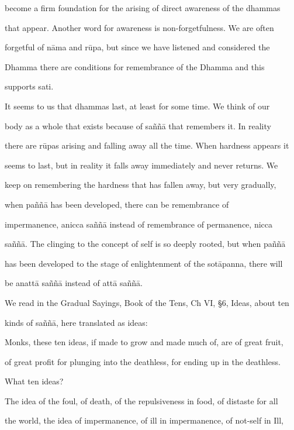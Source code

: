 become a firm foundation for the arising of direct awareness of the dhammas  

that  appear. Another word  for  awareness  is  non-forgetfulness. We  are  often  

forgetful  of  nāma  and  rūpa,  but  since we  have  listened  and  considered  the  

Dhamma   there   are   conditions   for   remembrance   of   the   Dhamma   and   this  

supports sati. 

   It  seems to us that  dhammas last,  at least for  some time. We think  of our  

body  as  a  whole  that  exists  because  of  saññā  that  remembers  it.  In  reality  

there are rūpas arising and falling away all the time. When hardness appears it  

seems to last, but  in reality  it falls  away  immediately  and never returns. We  

keep on remembering the hardness that has fallen  away, but very  gradually,  

when   paññā   has   been    developed,   there    can   be   remembrance    of  

impermanence,  anicca  saññā  instead  of  remembrance  of  permanence,  nicca  

saññā. The clinging to the concept of self is so deeply rooted, but when paññā  

has been developed to the stage of enlightenment of the sotāpanna, there will  

be anattā saññā instead of attā saññā. 

     

We read in the Gradual Sayings, Book of the Tens, Ch VI, §6, Ideas, about ten  

kinds of saññā, here translated as ideas: 

     

      Monks, these ten ideas, if made to grow and made much of, are of great fruit,  

      of great profit for plunging into the deathless, for ending up in the deathless.  

      What ten ideas? 

         The idea of the foul, of death, of the repulsiveness in food, of distaste for all  

      the world, the idea of impermanence, of ill in impermanence, of not-self in Ill,  

